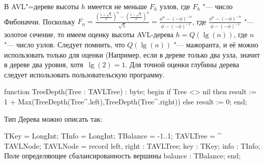 В AVL"=дереве высоты $h$ имеется не меньше $F_h$ узлов, где $F_h$ "--- число Фибоначчи.
Поскольку $F_n = \frac{(\frac{1 + \sqrt{5}}{2})^n - (\frac{1 - \sqrt{5}}{2})^n}{\sqrt{5}} =
\frac{\phi^n - (-\phi)^{-n}}{\phi - (-\phi)^{-1}}$,
где $\frac{\phi^n - (-\phi)^{-n}}{\phi - (-\phi)^{-1}}$ "--- золотое сечение,
то имеем оценку высоты AVL-дерева $h = Q(\lg(n))$,
где $n$ "--- число узлов. Следует помнить, что $Q(\lg(n))$ "--- мажоранта,
и её можно использовать только для оценки
(Например, если в дереве только два узла, значит в дереве два уровня,
хотя $\lg(2) = 1$. Для точной оценки глубины дерева следует использовать пользовательскую программу.

\begin{}
function TreeDepth(Tree : TAVLTree) : byte;
begin
   if Tree <> nil then
      result := 1 + Max(TreeDepth(Tree^.left),TreeDepth(Tree^.right))
  else
      result := 0;
end;
\end{}

Тип Дерева можно описать так:

\begin{}
TKey = LongInt;
TInfo = LongInt;
TBalance = -1..1;
TAVLTree = ^ TAVLNode;
  TAVLNode = record
    left, right : TAVLTree;
    key : TKey;
    info : TInfo;
{ Поле определяющее сбалансированность вершины }
    balance : TBalance;
  end;
\end{}